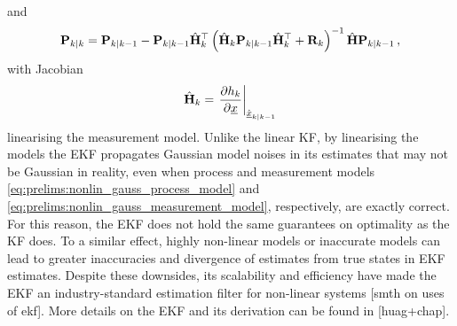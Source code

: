 and
\begin{equation}\label{eq:prelims:ekf_cov_update}
    {\ensuremath{{\mathbf{P}}}}_{k|k} = {{\mathbf{P}}}_{k|k-1}-{{\mathbf{P}}}_{k|k-1}\hat{{{\mathbf{H}}}}_k^\top\left(\hat{{{\mathbf{H}}}}_k{{\mathbf{P}}}_{k|k-1}\hat{{{\mathbf{H}}}}_k^\top + {{\mathbf{R}}}_k\right)^{-1}\hat{{{\mathbf{H}}}}{{\mathbf{P}}}_{k|k-1}\,,
\end{equation}
with Jacobian
\begin{equation}\label{eq:prelims:ekf_update_jacobian}
    \hat{{{\mathbf{H}}}}_k = \left.\frac{\partial h_k}{\partial {\underline{x}}}\right|_{\hat{{\underline{x}}}_{k|k-1}}
\end{equation}
linearising the measurement model. Unlike the linear KF, by linearising the models the EKF propagates Gaussian model noises in its estimates that may not be Gaussian in reality, even when process and measurement models \eqref{eq:prelims:nonlin_gauss_process_model} and \eqref{eq:prelims:nonlin_gauss_measurement_model}, respectively, are exactly correct. For this reason, the EKF does not hold the same guarantees on optimality as the KF does. To a similar effect, highly non-linear models or inaccurate models can lead to greater inaccuracies and divergence of estimates from true states in EKF estimates. Despite these downsides, its scalability and efficiency have made the EKF an industry-standard estimation filter for non-linear systems [smth on uses of ekf]. More details on the EKF and its derivation can be found in [huag+chap].

% 
% 


